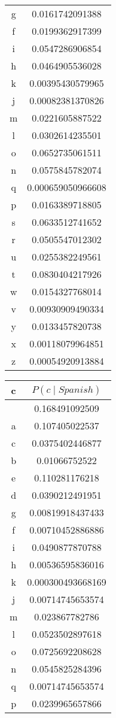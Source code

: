 \documentclass{article}
\begin{document}
\begin{center}
\begin{tabular}{c|c}
g & 0.0161742091388 \\
f & 0.0199362917399 \\
i & 0.0547286906854 \\
h & 0.0464905536028 \\
k & 0.00395430579965 \\
j & 0.00082381370826 \\
m & 0.0221605887522 \\
l & 0.0302614235501 \\
o & 0.0652735061511 \\
n & 0.0575845782074 \\
q & 0.000659050966608 \\
p & 0.0163389718805 \\
s & 0.0633512741652 \\
r & 0.0505547012302 \\
u & 0.0255382249561 \\
t & 0.0830404217926 \\
w & 0.0154327768014 \\
v & 0.00930909490334 \\
y & 0.0133457820738 \\
x & 0.00118079964851 \\
z & 0.00054920913884 \\
\end{tabular}
\begin{tabular}{c|c}
c & $P(c \mid Spanish)$ \\ \hline  & 0.168491092509 \\
a & 0.107405022537 \\
c & 0.0375402446877 \\
b & 0.01066752522 \\
e & 0.110281176218 \\
d & 0.0390212491951 \\
g & 0.00819918437433 \\
f & 0.00710452886886 \\
i & 0.0490877870788 \\
h & 0.00536595836016 \\
k & 0.000300493668169 \\
j & 0.00714745653574 \\
m & 0.023867782786 \\
l & 0.0523502897618 \\
o & 0.0725692208628 \\
n & 0.0545825284396 \\
q & 0.00714745653574 \\
p & 0.0239965657866 \\

\end{tabular}
\end{center}
\end{document}
